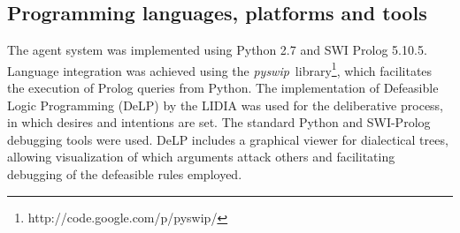 



% 
%

\subsection{Programming languages, platforms and tools}
    The agent system was implemented using Python 2.7 and SWI Prolog
    5.10.5.  Language integration was achieved using the \textit{pyswip}\
    library\footnote{http://code.google.com/p/pyswip/}, which facilitates the
    execution of Prolog queries from Python.  The implementation of Defeasible
    Logic Programming (DeLP) by the LIDIA \cite{Garcia:2004a} was used for the
    deliberative process, in which desires and intentions are set.  The
    standard Python and SWI-Prolog debugging tools were used.  DeLP includes
    a graphical viewer for dialectical trees, allowing visualization of which
    arguments attack others and facilitating debugging of the defeasible rules
    employed.  
    
